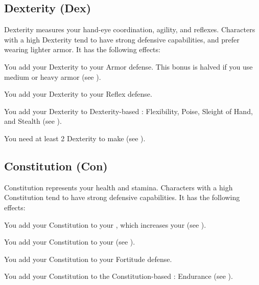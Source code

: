   \subsection{Dexterity (Dex)}\label{Dexterity}
    {
      Dexterity measures your hand-eye coordination, agility, and reflexes.
      Characters with a high Dexterity tend to have strong defensive capabilities, and prefer wearing lighter armor.
      It has the following effects:
      \begin{raggeditemize}
        \item You add your Dexterity to your Armor defense.
          This bonus is halved if you use medium or heavy armor (see ).
        \item You add your Dexterity to your Reflex defense.
        \item You add your Dexterity to Dexterity-based : Flexibility, Poise, Sleight of Hand, and Stealth (see ).
        \item You need at least 2 Dexterity to make  (see ).
      \end{raggeditemize}
    }

  \subsection{Constitution (Con)}\label{Constitution}
    {
      Constitution represents your health and stamina.
      Characters with a high Constitution tend to have strong defensive capabilities.
      It has the following effects:
      \begin{raggeditemize}
        \item You add your Constitution to your , which increases your  (see ).
        \item You add your Constitution to your  (see ).
        \item You add your Constitution to your Fortitude defense.
        \item You add your Constitution to the Constitution-based : Endurance (see ).
      \end{raggeditemize}
    }

